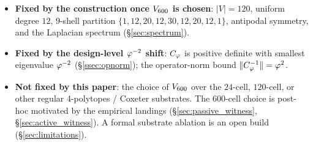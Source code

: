 \begin{itemize}\itemsep=2pt
\item \textbf{Fixed by the construction once $V_{600}$ is
  chosen}: $|V|=120$, uniform degree $12$, $9$-shell partition
  $\{1,12,20,12,30,12,20,12,1\}$, antipodal symmetry, and the
  Laplacian spectrum (\S\ref{sec:spectrum}).
\item \textbf{Fixed by the design-level $\varphi^{-2}$ shift}:
  $C_{\varphi}$ is positive definite with smallest eigenvalue $\varphi^{-2}$
  (\S\ref{ssec:opnorm}); the operator-norm bound
  $\|C_{\varphi}^{-1}\| = \varphi^{2}$.
\item \textbf{Not fixed by this paper}: the choice of
  $V_{600}$ over the $24$-cell, $120$-cell, or other regular
  4-polytopes / Coxeter substrates. The 600-cell choice is
  post-hoc motivated by the empirical landings
  (\S\ref{sec:passive_witness}, \S\ref{sec:active_witness}). A
  formal substrate ablation is an
  open build (\S\ref{sec:limitations}).
\end{itemize}
